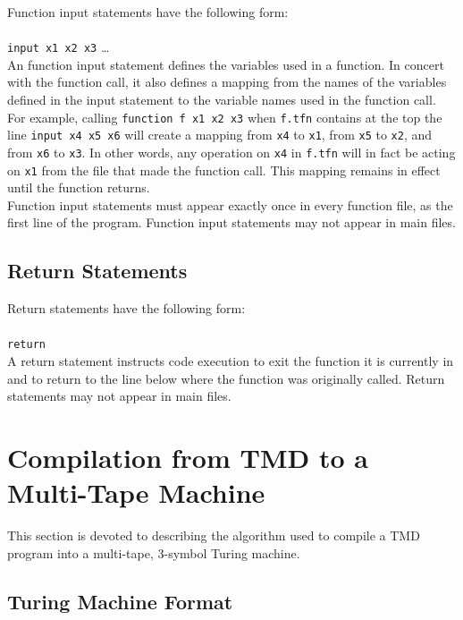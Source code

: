 \documentclass{report}
\begin{document}
Function input statements have the following form: \\ \\
\texttt{input x1 x2 x3} \dots \\

An function input statement defines the variables used in a function. In concert with the function call, it also defines a mapping from the names of the variables defined in the input statement to the variable names used in the function call. For example, calling \texttt{function f x1 x2 x3} when \texttt{f.tfn} contains at the top the line \texttt{input x4 x5 x6} will create a mapping from \texttt{x4} to \texttt{x1}, from \texttt{x5} to \texttt{x2}, and from \texttt{x6} to \texttt{x3}. In other words, any operation on \texttt{x4} in \texttt{f.tfn} will in fact be acting on \texttt{x1} from the file that made the function call. This mapping remains in effect until the function returns. \\

Function input statements must appear exactly once in every function file, as the first line of the program. Function input statements may not appear in main files.

\subsection{Return Statements}

Return statements have the following form: \\ \\
\texttt{return} \\

A return statement instructs code execution to exit the function it is currently in and to return to the line below where the function was originally called. Return statements may not appear in main files.

\section{Compilation from TMD to a Multi-Tape Machine \label{sec:turdtotm}}

This section is devoted to describing the algorithm used to compile a TMD program into a multi-tape, 3-symbol Turing machine.

\subsection{Turing Machine Format}
\end{document}

